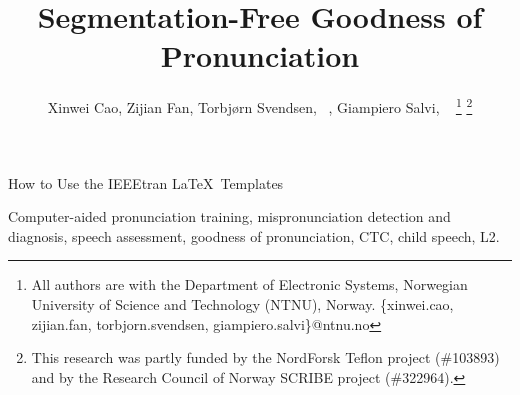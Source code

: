 \documentclass[lettersize]{IEEEtran}
\begin{document}
\title{Segmentation-Free Goodness of Pronunciation}
\author{Xinwei Cao, Zijian Fan, Torbjørn Svendsen, ~, Giampiero Salvi, ~
\thanks{All authors are with the Department of Electronic Systems, Norwegian University of Science and Technology (NTNU), Norway. \{xinwei.cao, zijian.fan, torbjorn.svendsen, giampiero.salvi\}@ntnu.no}
\thanks{This research was partly funded by the NordForsk Teflon project (\#103893) and by the Research Council of Norway SCRIBE project (\#322964).}
}

%
{How to Use the IEEEtran \LaTeX \ Templates}

\maketitle


%




\begin{abstract} %

\end{abstract}

\begin{IEEEkeywords}
Computer-aided pronunciation training, mispronunciation detection and diagnosis, speech assessment, goodness of pronunciation, CTC, child speech, L2.
\end{IEEEkeywords}






%
%
\printbibliography
\end{document}

